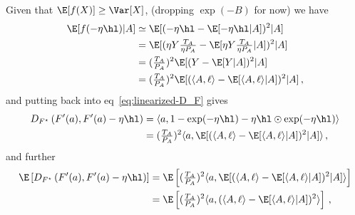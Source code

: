 Given that $\E[f(X)] \geq \Var[X]$, (dropping $\exp(-B)$ for now) we have
\begin{align*}
    \E[f(-\eta \hl)|A]
     & \simeq \E[(-\eta \hl - \E[-\eta \hl|A])^2|A]                                             \\
     & =\E[(\eta Y \tfrac{T_A}{\eta P_A} - \E[\eta Y \tfrac{T_A}{\eta P_A}|A])^2|A]             \\
     & =( \tfrac{T_A}{ P_A})^2 \E[(Y - \E[Y|A])^2|A]                                            \\
     & =(\tfrac{T_A}{P_A})^2 \E[(\langle A, \ell\rangle - \E[\langle A, \ell\rangle|A])^2|A]\,,
\end{align*}
and putting back into eq~\ref{eq:linearized-D_F} gives
\begin{align*}
    D_{F^\star}\left(F'(a), F'(a) - \eta \hl\right)
     & =
    \langle a,
    1
    - \exp(-\eta \hl)
    - \eta \hl \odot \exp(-\eta \hl)
    \rangle
    \\
     & =
    (\tfrac{T_A}{P_A})^2 \langle a, \E[(\langle A, \ell\rangle - \E[\langle A, \ell\rangle|A])^2|A]
    \rangle\,,
\end{align*}
and further
\begin{align*}
    \E\left[D_{F^\star}\left(F'(a), F'(a) - \eta \hl\right)\right]
     & =
    \E\left[
        (\tfrac{T_A}{P_A})^2 \langle a, \E[(\langle A, \ell\rangle - \E[\langle A, \ell\rangle|A])^2|A]\rangle
    \right] \\
     & =
    \E\left[
        (\tfrac{T_A}{P_A})^2 \langle a, (\langle A, \ell\rangle - \E[\langle A, \ell\rangle|A])^2\rangle
        \right]
    \,,
\end{align*}




\clearpage

